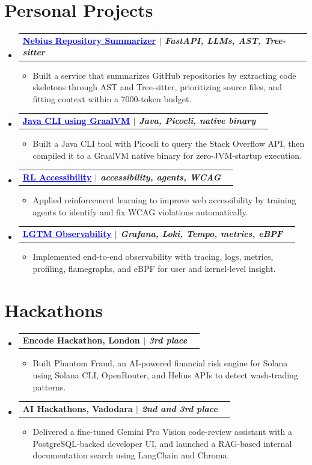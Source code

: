 \documentclass[letterpaper,11pt]{article}
\makeatletter
\newcommand{\resumeItem}[1]{
  \item\small{
    {#1 \vspace{-3pt}}
  }
}
\newcommand{\resumeProjectHeading}[2]{
  \vspace{-3pt}\item
    \begin{tabular*}{1.0\textwidth}[t]{l@{\extracolsep{\fill}}r}
      \textbf{#1} & \textbf{\small #2} \\
    \end{tabular*}\vspace{-7pt}
}
\newcommand{\projectLink}[2]{\href{#1}{\textcolor{blue}{\underline{#2}}}}
\newcommand{\resumeSubHeadingListStart}{\begin{itemize}[leftmargin=0.0in, label={}]}
\newcommand{\resumeSubHeadingListEnd}{\end{itemize}}
\newcommand{\resumeItemListStart}{\begin{itemize}}
\newcommand{\resumeItemListEnd}{\end{itemize}\vspace{0pt}}
\makeatother
\begin{document}
\section{Personal Projects}
\resumeSubHeadingListStart
    \resumeProjectHeading
      {\projectLink{https://github.com/aymanapatel/nebius-project}{Nebius Repository Summarizer} \emph{$|$ FastAPI, LLMs, AST, Tree-sitter}}{}
      \resumeItemListStart
        \resumeItem{Built a service that summarizes GitHub repositories by extracting code skeletons through AST and Tree-sitter, prioritizing source files, and fitting context within a 7000-token budget.}
      \resumeItemListEnd
    \resumeProjectHeading
      {\projectLink{https://github.com/aymanapatel/java-cli}{Java CLI using GraalVM} \emph{$|$ Java, Picocli, native binary}}{}
      \resumeItemListStart
        \resumeItem{Built a Java CLI tool with Picocli to query the Stack Overflow API, then compiled it to a GraalVM native binary for zero-JVM-startup execution.}
      \resumeItemListEnd
    \resumeProjectHeading
      {\projectLink{https://github.com/aymanapatel/rl-a11y}{RL Accessibility} \emph{$|$ accessibility, agents, WCAG}}{}
      \resumeItemListStart
        \resumeItem{Applied reinforcement learning to improve web accessibility by training agents to identify and fix WCAG violations automatically.}
      \resumeItemListEnd
    \resumeProjectHeading
      {\projectLink{https://aymanace2049.hashnode.dev/grafana-one-observability-tool-to-rule-them-all}{LGTM Observability} \emph{$|$ Grafana, Loki, Tempo, metrics, eBPF}}{}
      \resumeItemListStart
        \resumeItem{Implemented end-to-end observability with tracing, logs, metrics, profiling, flamegraphs, and eBPF for user and kernel-level insight.}
      \resumeItemListEnd
\resumeSubHeadingListEnd

\section{Hackathons}
\resumeSubHeadingListStart
    \resumeProjectHeading
      {Encode Hackathon, London \emph{$|$ 3rd place}}{}
      \resumeItemListStart
        \resumeItem{Built Phantom Fraud, an AI-powered financial risk engine for Solana using Solana CLI, OpenRouter, and Helius APIs to detect wash-trading patterns.}
      \resumeItemListEnd
    \resumeProjectHeading
      {AI Hackathons, Vadodara \emph{$|$ 2nd and 3rd place}}{}
      \resumeItemListStart
        \resumeItem{Delivered a fine-tuned Gemini Pro Vision code-review assistant with a PostgreSQL-backed developer UI, and launched a RAG-based internal documentation search using LangChain and Chroma.}
      \resumeItemListEnd
\resumeSubHeadingListEnd
\end{document}
